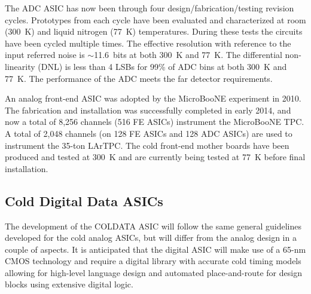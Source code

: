  The ADC ASIC has now been through four design/fabrication/testing revision cycles.
Prototypes from each cycle have been evaluated and characterized at room (300~K) and liquid nitrogen (77~K) temperatures.
During these tests the circuits have been cycled multiple times.
The effective resolution with reference to the input referred noise is $\sim$11.6~bits at both 300~K and 77~K.
The differential non-linearity (DNL) is less than 4 LSBs for 99\% of ADC bins at both 300~K and 77~K.
The performance of the ADC meets the far detector requirements.

An analog front-end ASIC was adopted by the MicroBooNE experiment in 2010.\cite{microboone-url}
The fabrication and installation was successfully completed in early 2014, and now 
a total of 8,256 channels (516 FE ASICs) instrument the MicroBooNE TPC. 
A total of 2,048 channels (on 128 FE ASICs and 128 ADC ASICs) are used to instrument the 35-ton 
LArTPC. 
The cold front-end mother boards have been produced and tested at 300~K and are currently
being tested at 77~K before final installation. %


%
\subsection{Cold Digital Data ASICs}
\label{subsec:fe_CMOS_digital}

The development of the COLDATA ASIC will follow the same general guidelines developed for the cold analog ASICs, but
will differ from the analog design in a couple of aspects.
It is anticipated that the digital ASIC will make use of a 65-nm CMOS technology and require a
digital library with accurate cold timing models allowing for high-level language design and
automated place-and-route  for design blocks using extensive digital logic.  

